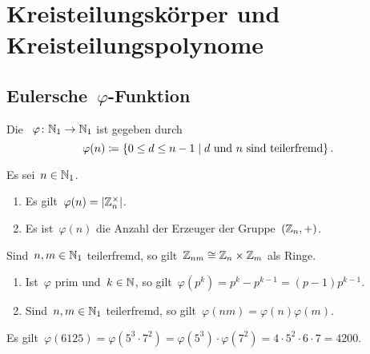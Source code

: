 \section{Kreisteilungskörper und Kreisteilungspolynome}



\subsection{Eulersche~\texorpdfstring{$\varphi$}{phi}-Funktion}

\begin{definition}
  Die ~$\varphi \colon \Natural_1 \to \Natural_1$ ist gegeben durch
  \[
    \varphi(n)
    \defined
    \{
      0 \leq d \leq n-1
    \suchthat
      \text{$d$ und~$n$ sind teilerfremd}
    \} \,.
  \]
\end{definition}

\begin{proposition}
  Es sei~$n \in \mathbb{N}_1$.
  \begin{enumerate}
    \item
      Es gilt~$\varphi(n) = \lvert \mathbb{Z}_n^\times \rvert$.
    \item
      Es ist~$\varphi(n)$ die Anzahl der Erzeuger der Gruppe~$(\mathbb{Z}_n, +)$.
  \end{enumerate}
\end{proposition}

\begin{lemma}
  Sind~$n, m \in \mathbb{N}_1$ teilerfremd, so gilt~$\mathbb{Z}_{nm} \cong \mathbb{Z}_n \times \mathbb{Z}_m$ als Ringe.
\end{lemma}

\begin{proposition}
  \leavevmode
  \begin{enumerate}
    \item
      Ist~$\varphi$ prim und~$k \in \mathbb{N}$, so gilt~$\varphi(p^k) = p^k - p^{k-1} = (p-1) p^{k-1}$.
    \item
      Sind~$n, m \in \mathbb{N}_1$ teilerfremd, so gilt~$\varphi(nm) = \varphi(n) \varphi(m)$.
  \end{enumerate}
\end{proposition}

\begin{example}
  Es gilt~$\varphi(6125) = \varphi(5^3 \cdot 7^2) = \varphi(5^3) \cdot \varphi(7^2) = 4 \cdot 5^2 \cdot 6 \cdot 7 = 4200$.
\end{example}



